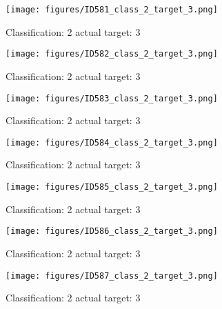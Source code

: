 \begin{figure}[h!]
\begin{center}
\texttt{[image: figures/ID581\_class\_2\_target\_3.png]}
\end{center}
\caption{ Classification: 2 actual target: 3}
\label{fig:ID581_class_2_target_3}
\end{figure}
\begin{figure}[h!]
\begin{center}
\texttt{[image: figures/ID582\_class\_2\_target\_3.png]}
\end{center}
\caption{ Classification: 2 actual target: 3}
\label{fig:ID582_class_2_target_3}
\end{figure}
\begin{figure}[h!]
\begin{center}
\texttt{[image: figures/ID583\_class\_2\_target\_3.png]}
\end{center}
\caption{ Classification: 2 actual target: 3}
\label{fig:ID583_class_2_target_3}
\end{figure}
\begin{figure}[h!]
\begin{center}
\texttt{[image: figures/ID584\_class\_2\_target\_3.png]}
\end{center}
\caption{ Classification: 2 actual target: 3}
\label{fig:ID584_class_2_target_3}
\end{figure}
\begin{figure}[h!]
\begin{center}
\texttt{[image: figures/ID585\_class\_2\_target\_3.png]}
\end{center}
\caption{ Classification: 2 actual target: 3}
\label{fig:ID585_class_2_target_3}
\end{figure}
\begin{figure}[h!]
\begin{center}
\texttt{[image: figures/ID586\_class\_2\_target\_3.png]}
\end{center}
\caption{ Classification: 2 actual target: 3}
\label{fig:ID586_class_2_target_3}
\end{figure}
\begin{figure}[h!]
\begin{center}
\texttt{[image: figures/ID587\_class\_2\_target\_3.png]}
\end{center}
\caption{ Classification: 2 actual target: 3}
\label{fig:ID587_class_2_target_3}
\end{figure}
